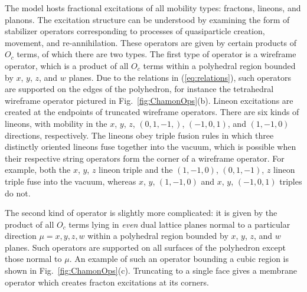 \documentclass[prx,twocolumn,superscriptaddress,nofootinbib,showpacs,notitlepage]{revtex4-2}
\begin{document}
The model hosts fractional excitations of all mobility types: fractons, lineons, and planons. The excitation structure can be understood by examining the form of stabilizer operators corresponding to processes of quasiparticle creation, movement, and re-annihilation. These operators are given by certain products of $O_c$ terms, of which there are two types. The first type of operator is a wireframe operator, which is a product of all $O_c$ terms within a polyhedral region bounded by $x$, $y$, $z$, and $w$ planes. Due to the relations in (\ref{eq:relations}), such operators are supported on the edges of the polyhedron, for instance the tetrahedral wireframe operator pictured in Fig.~\ref{fig:ChamonOps}(b). Lineon excitations are created at the endpoints of truncated wireframe operators. There are six kinds of lineons, with mobility in the $x$, $y$, $z$, $(0,1,-1,)$, $(-1,0,1)$, and $(1,-1,0)$ directions, respectively. The lineons obey triple fusion rules in which three distinctly oriented lineons fuse together into the vacuum, which is possible when their respective string operators form the corner of a wireframe operator. For example, both the $x$, $y$, $z$ lineon triple and the $(1,-1,0)$, $(0,1,-1)$, $z$ lineon triple fuse into the vacuum, whereas $x$, $y$, $(1,-1,0)$ and $x$, $y$, $(-1,0,1)$ triples do not.

The second kind of operator is slightly more complicated: it is given by the product of all $O_c$ terms lying in \textit{even} dual lattice planes normal to a particular direction $\mu=x,y,z,w$ within a polyhedral region bounded by $x$, $y$, $z$, and $w$ planes. Such operators are supported on all surfaces of the polyhedron except those normal to $\mu$. An example of such an operator bounding a cubic region is shown in Fig.~\ref{fig:ChamonOps}(c). Truncating to a single face gives a membrane operator which creates fracton excitations at its corners.
\end{document}
